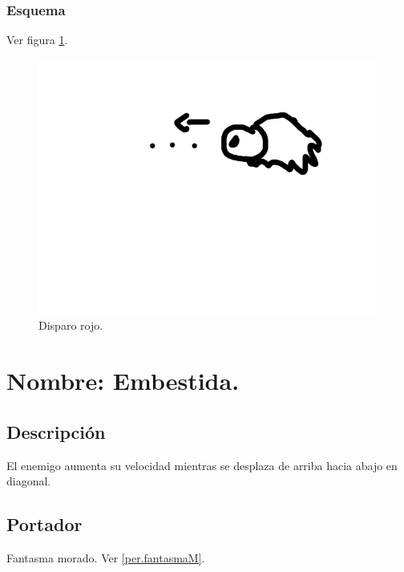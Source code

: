 		\subsubsection{Esquema}
		Ver figura \ref{fig:disparoR}.
		\begin{figure}
			\centering
			\includegraphics[height=0.2 \textheight]{Imagenes/disparoR}
			\caption{Disparo rojo.}
			\label{fig:disparoR}
		\end{figure}
	\section{Nombre: Embestida.} \label{hab.embestida}
		\subsection{Descripción}
		El enemigo aumenta su velocidad mientras se desplaza de arriba hacia abajo en diagonal.
		\subsection{Portador}
		Fantasma morado. Ver \ref{per.fantasmaM}.
